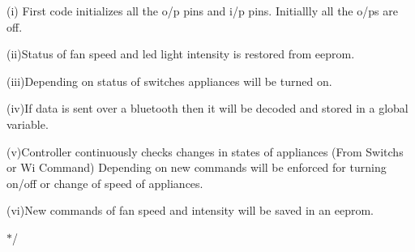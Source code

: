 (i) First code initializes all the o/p pins and i/p pins. Initiallly all the o/ps are off.

(ii)Status of fan speed and led light intensity is restored from eeprom.

(iii)Depending on status of switches appliances will be turned on.

(iv)If data is sent over a bluetooth then it will be decoded and stored in a global variable.

(v)Controller continuously checks changes in states of appliances (From Switchs or Wi Command) Depending on new commands will be enforced for turning on/off or change of speed of appliances.

(vi)New commands of fan speed and intensity will be saved in an eeprom.

$\ast$/ 